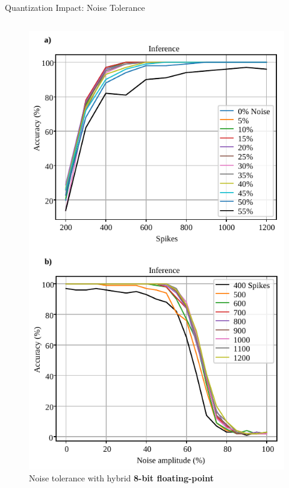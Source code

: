 \begin{frame}{Quantization Impact: Noise Tolerance}
\begin{columns}
		\begin{column}{0.33\textwidth}
			\centering
			\begin{figure}
			\includegraphics[width=0.75\linewidth]{../chapters/sbs_accelerator/figures/accuracy_vs_noise_pu_cfp(4-bit-exponent_1-bit-mantissa).pdf} %
			\caption{ Noise tolerance with hybrid \textbf{8-bit floating-point}}
			\end{figure}
			\pause
		\end{column}
		

\end{columns}
\end{frame}
